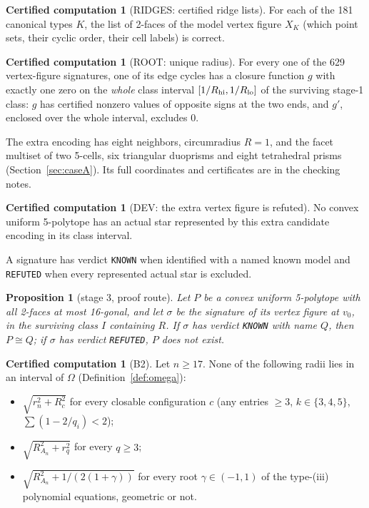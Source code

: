 \documentclass[11pt]{article}
\newtheorem{proposition}[theorem]{Proposition}
\theoremstyle{definition}
\newtheorem{computation}[theorem]{Certified computation}
\theoremstyle{remark}
\begin{document}
\begin{appendices}
\begin{computation}[RIDGES: certified ridge lists]\label{comp:ridges}
For each of the 181 canonical types $K$, the list of 2-faces of the model
vertex figure $X_K$ (which point sets, their cyclic order, their cell
labels) is correct.
\end{computation}

\begin{computation}[ROOT: unique radius]\label{comp:root}
For every one of the 629 vertex-figure signatures, one of its edge cycles
has a closure function $g$ with exactly one zero on the \emph{whole} class
interval $[1/R_{\rm hi},1/R_{\rm lo}]$ of the surviving stage-1 class:
$g$ has certified nonzero values of opposite signs at the two ends, and
$g'$, enclosed over the whole interval, excludes $0$.
\end{computation}

The extra encoding has eight neighbors, circumradius $R=1$, and the facet multiset of two 5-cells, six triangular duoprisms and eight tetrahedral prisms (Section~\ref{sec:caseA}). Its full coordinates and certificates are in the checking notes.\par
\begin{computation}[DEV: the extra vertex figure is refuted]\label{comp:dev}
No convex uniform 5-polytope has an actual star represented by this extra
candidate encoding in its class interval.
\end{computation}

A signature has verdict \texttt{KNOWN} when identified with a named known model and \texttt{REFUTED} when every represented actual star is excluded.
\begin{proposition}[stage 3, proof route]\label{prop:u3}
Let $P$ be a convex uniform 5-polytope with all 2-faces at most 16-gonal,
and let $\sigma$ be the signature of its vertex figure at $v_0$, in the
surviving class $I$ containing $R$. If $\sigma$ has verdict \texttt{KNOWN}
with name $Q$, then $P\cong Q$; if $\sigma$ has verdict \texttt{REFUTED},
$P$ does not exist.
\end{proposition}

\begin{computation}[B2]\label{comp:B2}
Let $n\ge17$. None of the following radii lies in an interval of $\Omega$
(Definition~\ref{def:omega}):
\begin{itemize}[leftmargin=2em]
\item $\sqrt{r_n^2+R_c^2}$ for every closable configuration $c$ (any
  entries $\ge3$, $k\in\{3,4,5\}$, $\sum(1-2/q_i)<2$);
\item $\sqrt{R_{A_n}^2+r_q^2}$ for every $q\ge3$;
\item $\sqrt{R_{A_n}^2+1/(2(1+\gamma))}$ for every root $\gamma\in(-1,1)$
  of the type-(iii) polynomial equations, geometric or not.
\end{itemize}
\end{computation}


\end{appendices}
\end{document}

